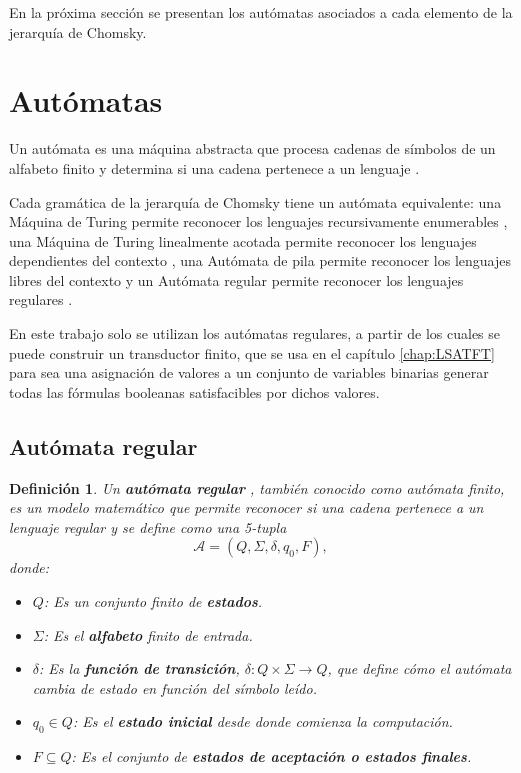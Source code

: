 \documentclass[12pt]{article}
\newtheorem{definition}{Definición}
\begin{document}
En la próxima sección se presentan los autómatas asociados a cada elemento de la jerarquía de Chomsky.
\section{Autómatas}

Un autómata es una máquina abstracta que procesa cadenas de símbolos de un alfabeto finito y determina si una 
cadena pertenece a un lenguaje \cite{authomataTheory}.

Cada gramática de la jerarquía de Chomsky tiene un autómata equivalente: una Máquina de Turing permite reconocer 
los lenguajes recursivamente enumerables \cite{authomataTheory}, una Máquina de Turing linealmente acotada 
permite reconocer los lenguajes dependientes del contexto \cite{authomataTheory}, una Autómata de pila permite 
reconocer los lenguajes libres del contexto \cite{authomataTheory} y un Autómata regular permite reconocer los 
lenguajes regulares \cite{authomataTheory}.

En este trabajo solo se utilizan los autómatas regulares, a partir de los cuales se puede construir un transductor finito, 
que se usa en el capítulo \ref{chap:LSATFT} para sea una asignación de valores a un conjunto de variables binarias generar 
todas las fórmulas booleanas satisfacibles por dichos valores.

\subsection{Autómata regular}

\begin{definition}
  Un \textbf{autómata regular} \cite{authomataTheory}, también conocido como autómata finito, es un modelo matemático que permite reconocer si una cadena pertenece a un lenguaje regular y se define como una 5-tupla $$\mathcal{A} = (Q, \Sigma, \delta, q_0, F),$$ donde:
  
  \begin{itemize}
    \item $Q$: Es un conjunto finito de \textbf{estados}.
    \item $\Sigma$: Es el \textbf{alfabeto} finito de entrada.
    \item $\delta$: Es la \textbf{función de transición}, $\delta: Q \times \Sigma \to Q$, que define cómo el autómata cambia de estado en función del símbolo leído.
    \item $q_0 \in Q$: Es el \textbf{estado inicial} desde donde comienza la computación.
    \item $F \subseteq Q$: Es el conjunto de \textbf{estados de aceptación o estados finales}.
  \end{itemize}
\end{definition}
\end{document}
